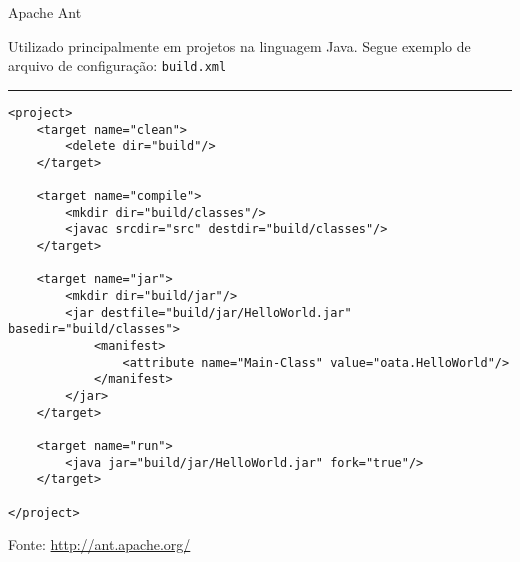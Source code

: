 \begin{frame}[fragile]{Apache Ant}

Utilizado principalmente em projetos na linguagem Java. Segue exemplo 
de arquivo de configuração:\bigskip
\scriptsize
{\tt build.xml}
\hrule\tiny
\begin{verbatim}
<project>
    <target name="clean">
        <delete dir="build"/>
    </target>

    <target name="compile">
        <mkdir dir="build/classes"/>
        <javac srcdir="src" destdir="build/classes"/>
    </target>

    <target name="jar">
        <mkdir dir="build/jar"/>
        <jar destfile="build/jar/HelloWorld.jar" basedir="build/classes">
            <manifest>
                <attribute name="Main-Class" value="oata.HelloWorld"/>
            </manifest>
        </jar>
    </target>

    <target name="run">
        <java jar="build/jar/HelloWorld.jar" fork="true"/>
    </target>

</project>
\end{verbatim}
\tiny Fonte: \url{http://ant.apache.org/}
\end{frame}


